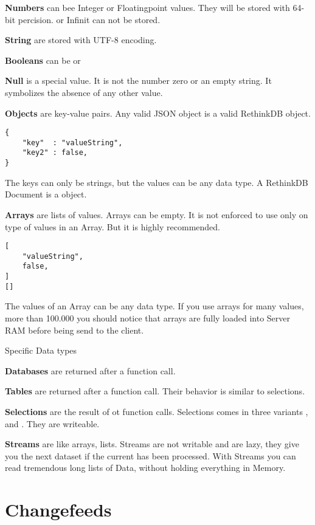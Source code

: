 \textbf{Numbers} can bee Integer or Floatingpoint values. 
They will be stored with 64-bit percision.
 or Infinit can not be stored.

\textbf{String} are stored with UTF-8 encoding.

\textbf{Booleans} can be  or 

\textbf{Null} is a special value.
It is not the number zero or an empty string.
It symbolizes the absence of any other value.

\textbf{Objects} are key-value pairs.
Any valid JSON object is a valid RethinkDB object.
\begin{lstlisting}[frame=single, caption=example Object, label=refdoc]
{
	"key"  : "valueString",
	"key2" : false,
}
\end{lstlisting}
The keys can only be strings, but the values can be any data type.
A RethinkDB Document is a object.

\textbf{Arrays} are lists of values.
Arrays can be empty.
It is not enforced to use only on type of values in an Array.
But it is highly recommended.
\begin{lstlisting}[frame=single, caption=example Arrays, label=refdoc]
[
	"valueString",
	false,
]
[]
\end{lstlisting}
The values of an Array can be any data type.
If you use arrays for many values, more than 100.000 you should notice that arrays are fully loaded into Server RAM before being send to the client.

Specific Data types

\textbf{Databases} are returned after a  function call.

\textbf{Tables} are returned after a  function call.
Their behavior is similar to selections.

\textbf{Selections} are the result of  ot  function calls.
Selections comes in three variants ,  and .
They are writeable.

\textbf{Streams} are like arrays, lists.
Streams are not writable and are lazy, they give you the next dataset if the current has been processed.
With Streams you can read tremendous long lists of Data, without holding everything in Memory.


\section{Changefeeds}

